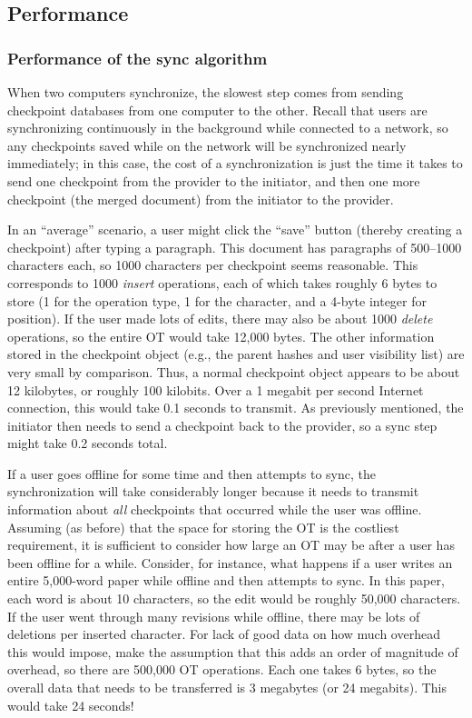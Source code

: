 \documentclass[11pt,titlepage]{article}
\begin{document}
\subsection{Performance}

\subsubsection{Performance of the sync algorithm}

When two computers synchronize, the slowest step comes from
sending checkpoint databases from one computer to the
other. Recall that users are synchronizing continuously in
the background while connected to a network, so any
checkpoints saved while on the network will be synchronized
nearly immediately; in this case, the cost of a
synchronization is just the time it takes to send one
checkpoint from the provider to the initiator, and then one
more checkpoint (the merged document) from the initiator to
the provider.

In an ``average'' scenario, a user might click the ``save''
button (thereby creating a checkpoint) after typing a
paragraph. This document has paragraphs of 500--1000
characters each, so 1000 characters per checkpoint seems
reasonable. This corresponds to 1000 \emph{insert}
operations, each of which takes roughly 6 bytes to store (1
for the operation type, 1 for the character, and a 4-byte
integer for position). If the user made lots of edits,
there may also be about 1000 \emph{delete} operations, so
the entire OT would take 12,000 bytes. The other
information stored in the checkpoint object (e.g., the
parent hashes and user visibility list) are very small by
comparison. Thus, a normal checkpoint object appears to be
about 12 kilobytes, or roughly 100 kilobits. Over a 1
megabit per second Internet connection, this would take 0.1
seconds to transmit. As previously mentioned, the initiator
then needs to send a checkpoint back to the provider, so a
sync step might take 0.2 seconds total.

If a user goes offline for some time and then attempts to
sync, the synchronization will take considerably longer
because it needs to transmit information about \emph{all}
checkpoints that occurred while the user was offline.
Assuming (as before) that the space for storing the OT is
the costliest requirement, it is sufficient to consider how
large an OT may be after a user has been offline for a
while. Consider, for instance, what happens if a user
writes an entire 5,000-word paper while offline and then
attempts to sync. In this paper, each word is about 10
characters, so the edit would be roughly 50,000 characters.
If the user went through many revisions while offline,
there may be lots of deletions per inserted character. For
lack of good data on how much overhead this would impose,
make the assumption that this adds an order of magnitude of
overhead, so there are 500,000 OT operations. Each one
takes 6 bytes, so the overall data that needs to be
transferred is 3 megabytes (or 24 megabits). This would
take 24 seconds!
\end{document}
